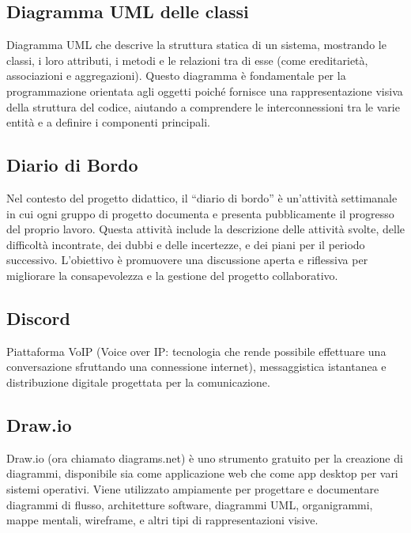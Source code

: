 \subsection*{Diagramma UML delle classi}
Diagramma UML che descrive la struttura statica di un sistema, mostrando le classi, i loro attributi, i metodi e le relazioni tra di esse (come ereditarietà, 
associazioni e aggregazioni). Questo diagramma è fondamentale per la programmazione orientata agli oggetti poiché fornisce una rappresentazione visiva della 
struttura del codice, aiutando a comprendere le interconnessioni tra le varie entità e a definire i componenti principali.

\hypertarget{sec:diario_di_bordo}{}
\subsection*{Diario di Bordo}
Nel contesto del progetto didattico, il “diario di bordo” è un’attività settimanale in cui ogni gruppo di progetto documenta e presenta pubblicamente il progresso del proprio lavoro. 
Questa attività include la descrizione delle attività svolte, delle difficoltà incontrate, dei dubbi e delle incertezze, e dei piani per il periodo successivo. 
L’obiettivo è promuovere una discussione aperta e riflessiva per migliorare la consapevolezza e la gestione del progetto collaborativo.

\subsection*{Discord}
Piattaforma VoIP (Voice over IP: tecnologia che rende possibile effettuare una conversazione sfruttando una connessione internet), messaggistica istantanea 
e distribuzione digitale progettata per la comunicazione.

\subsection*{Draw.io}
Draw.io (ora chiamato diagrams.net) è uno strumento gratuito per la creazione di diagrammi, disponibile sia come applicazione web che come app desktop per 
vari sistemi operativi. Viene utilizzato ampiamente per progettare e documentare diagrammi di flusso, architetture software, diagrammi UML, organigrammi, 
mappe mentali, wireframe, e altri tipi di rappresentazioni visive.

\newpage



